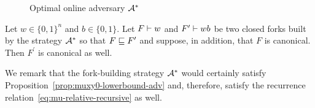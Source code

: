 \begin{figure}[!h]
\begin{center}
{\begin{minipage}{.9 \textwidth}
			
				



	    \end{minipage}
	  }
	\end{center}
	\caption{Optimal online adversary $\mathcal{A}^*$}
	\label{fig:adv-opt}
 \end{figure}

	


	\begin{theorem}\label{thm:canonical-fork}
		Let $w \in \{0,1\}^n$ and $b \in \{0,1\}$. 
		Let $F \vdash w$ and $F^\prime \vdash wb$ be two closed forks 
		built by the strategy $\mathcal{A}^*$ 
		so that $F \sqsubseteq F^\prime$ and suppose, in addition, 
		that $F$ is canonical. 
		Then $F^\prime$ is canonical as well.
	\end{theorem}
	We remark that the fork-building strategy $\mathcal{A}^*$ 
	would certainly satisfy Proposition~\ref{prop:muxy0-lowerbound-adv} and, therefore, 
	satisfy the recurrence relation~\eqref{eq:mu-relative-recursive} as well.

